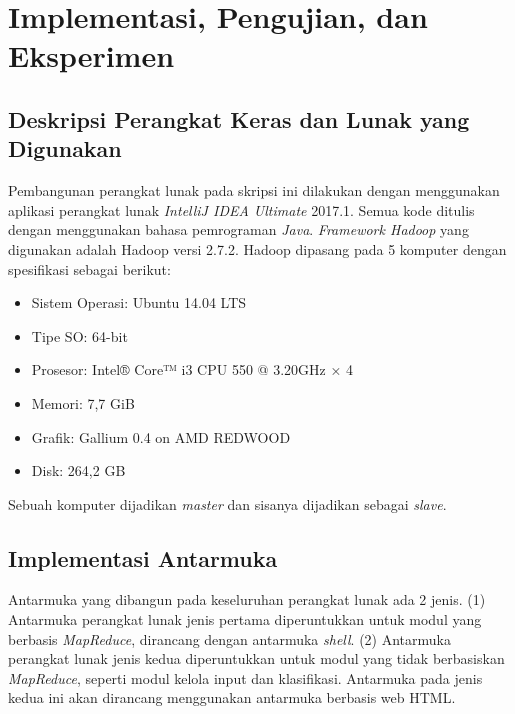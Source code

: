 \chapter{Implementasi, Pengujian, dan Eksperimen}

\section{Deskripsi Perangkat Keras dan Lunak yang Digunakan}
\label{sec:desc_perangkat}
Pembangunan perangkat lunak pada skripsi ini dilakukan dengan menggunakan aplikasi perangkat lunak \textit{IntelliJ IDEA Ultimate} 2017.1. Semua kode ditulis dengan menggunakan bahasa pemrograman \textit{Java}. \textit{Framework Hadoop} yang digunakan adalah Hadoop versi 2.7.2. Hadoop dipasang pada 5 komputer dengan spesifikasi sebagai berikut:
\begin{itemize}
	\item Sistem Operasi: Ubuntu 14.04 LTS
	\item Tipe SO: 64-bit
	\item Prosesor: Intel® Core™ i3 CPU 550 @ 3.20GHz × 4 
	\item Memori: 7,7 GiB
	\item Grafik: Gallium 0.4 on AMD REDWOOD
	\item Disk: 264,2 GB
\end{itemize}
Sebuah komputer dijadikan \textit{master} dan sisanya dijadikan sebagai \textit{slave}.

\section{Implementasi Antarmuka}
\label{sec:impl_antarmuka}

Antarmuka yang dibangun pada keseluruhan perangkat lunak ada 2 jenis. (1) Antarmuka perangkat lunak jenis pertama diperuntukkan untuk modul yang berbasis \textit{MapReduce}, dirancang dengan antarmuka \textit{shell}. (2) Antarmuka perangkat lunak jenis kedua diperuntukkan untuk modul yang tidak berbasiskan \textit{MapReduce}, seperti modul kelola input dan klasifikasi. Antarmuka pada jenis kedua ini akan dirancang menggunakan antarmuka berbasis web HTML.

